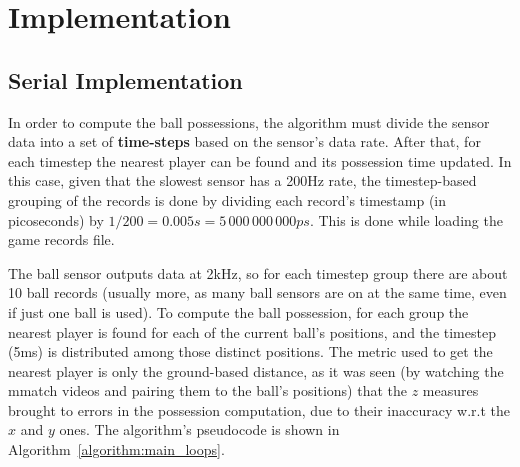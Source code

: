 \documentclass[a4paper, 10pt]{article}
\begin{document}
\section*{Implementation}

\subsection*{Serial Implementation}

In order to compute the ball possessions, the algorithm must divide the sensor data into a set of {\bf time-steps} based on the sensor's data rate.
After that, for each timestep the nearest player can be found and its possession time updated.
In this case, given that the slowest sensor has a 200Hz rate, the timestep-based grouping of the records is done by dividing each record's timestamp (in picoseconds) by $1 / 200 = 0.005s = 5\,000\,000\,000ps$.
This is done while loading the game records file.


The ball sensor outputs data at 2kHz, so for each timestep group there are about 10 ball records (usually more, as many ball sensors are on at the same time, even if just one ball is used).
To compute the ball possession, for each group the nearest player is found for each of the current ball's positions, and the timestep (5ms) is distributed among those distinct positions.
The metric used to get the nearest player is only the ground-based distance, as it was seen (by watching the mmatch videos and pairing them to the ball's positions) that the $z$ measures brought to errors in the possession computation, due to their inaccuracy w.r.t the $x$ and $y$ ones.
The algorithm's pseudocode is shown in Algorithm~\ref{algorithm:main_loops}.
\end{document}
